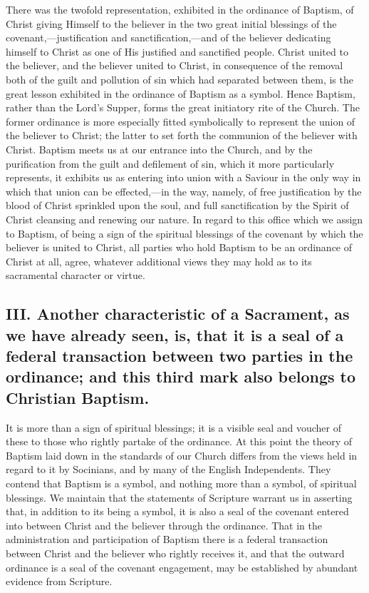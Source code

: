 \documentclass[]{book}
\begin{document}
There was the twofold representation, exhibited in the ordinance of Baptism, of Christ giving Himself to the believer in the two great initial blessings of the covenant,---justification and sanctification,---and of the believer dedicating himself to Christ as one of His justified and sanctified people. Christ united to the believer, and the believer united to Christ, in consequence of the removal both of the guilt and pollution of sin which had separated between them, is the great lesson exhibited in the ordinance of Baptism as a symbol. Hence Baptism, rather than the Lord's Supper, forms the great initiatory rite of the Church. The former ordinance is more especially fitted symbolically to represent the union of the believer to Christ; the latter to set forth the communion of the believer with Christ. Baptism meets us at our entrance into the Church, and by the purification from the guilt and defilement of sin, which it more particularly represents, it exhibits us as entering into union with a Saviour in the only way in which that union can be effected,---in the way, namely, of free justification by the blood of Christ sprinkled upon the soul, and full sanctification by the Spirit of Christ cleansing and renewing our nature. In regard to this office which we assign to Baptism, of being a sign of the spiritual blessings of the covenant by which the believer is united to Christ, all parties who hold Baptism to be an ordinance of Christ at all, agree, whatever additional views they may hold as to its sacramental character or virtue.

\hypertarget{iii.-another-characteristic-of-a-sacrament-as-we-have-already-seen-is-that-it-is-a-seal-of-a-federal-transaction-between-two-parties-in-the-ordinance-and-this-third-mark-also-belongs-to-christian-baptism.}{%
\subsection{III. Another characteristic of a Sacrament, as we have already seen, is, that it is a seal of a federal transaction between two parties in the ordinance; and this third mark also belongs to Christian Baptism.}\label{iii.-another-characteristic-of-a-sacrament-as-we-have-already-seen-is-that-it-is-a-seal-of-a-federal-transaction-between-two-parties-in-the-ordinance-and-this-third-mark-also-belongs-to-christian-baptism.}}

It is more than a sign of spiritual blessings; it is a visible seal and voucher of these to those who rightly partake of the ordinance. At this point the theory of Baptism laid down in the standards of our Church differs from the views held in regard to it by Socinians, and by many of the English Independents. They contend that Baptism is a symbol, and nothing more than a symbol, of spiritual blessings. We maintain that the statements of Scripture warrant us in asserting that, in addition to its being a symbol, it is also a seal of the covenant entered into between Christ and the believer through the ordinance. That in the administration and participation of Baptism there is a federal transaction between Christ and the believer who rightly receives it, and that the outward ordinance is a seal of the covenant engagement, may be established by abundant evidence from Scripture.
\end{document}
